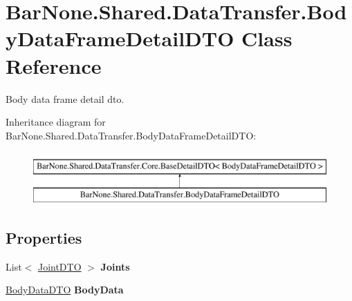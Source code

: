 \hypertarget{class_bar_none_1_1_shared_1_1_data_transfer_1_1_body_data_frame_detail_d_t_o}{}\section{Bar\+None.\+Shared.\+Data\+Transfer.\+Body\+Data\+Frame\+Detail\+D\+TO Class Reference}
\label{class_bar_none_1_1_shared_1_1_data_transfer_1_1_body_data_frame_detail_d_t_o}


Body data frame detail dto.  


Inheritance diagram for Bar\+None.\+Shared.\+Data\+Transfer.\+Body\+Data\+Frame\+Detail\+D\+TO\+:\begin{figure}[H]
\begin{center}
\leavevmode
\includegraphics[height=2.000000cm]{class_bar_none_1_1_shared_1_1_data_transfer_1_1_body_data_frame_detail_d_t_o}
\end{center}
\end{figure}
\subsection*{Properties}
\begin{DoxyCompactItemize}
\item 
\mbox{\label{class_bar_none_1_1_shared_1_1_data_transfer_1_1_body_data_frame_detail_d_t_o_a15006ae1cc5ddb9e9459f436aec7eed9}} 
List$<$ \mbox{\hyperlink{class_bar_none_1_1_shared_1_1_data_transfer_1_1_joint_d_t_o}{Joint\+D\+TO}} $>$ {\bfseries Joints}
\item 
\mbox{\label{class_bar_none_1_1_shared_1_1_data_transfer_1_1_body_data_frame_detail_d_t_o_a6976f3e79778728f6aa9776b85bf1281}} 
\mbox{\hyperlink{class_bar_none_1_1_shared_1_1_data_transfer_1_1_body_data_d_t_o}{Body\+Data\+D\+TO}} {\bfseries Body\+Data}
\end{DoxyCompactItemize}


